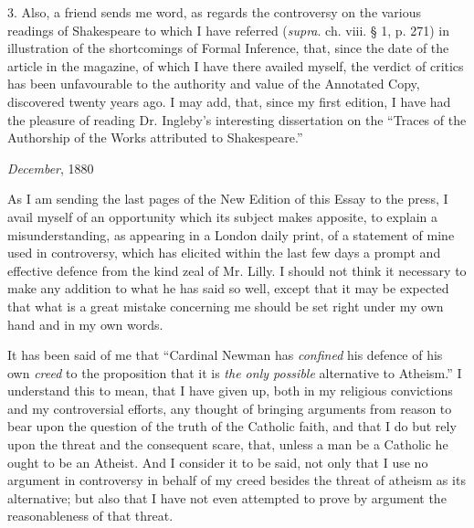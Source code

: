3. Also, a friend sends me word, as regards the controversy on the
various readings of Shakespeare to which I have referred (\emph{supra}.
ch. viii. § 1, p. 271) in illustration of the shortcomings of Formal
Inference, that, since the date of the article in the magazine, of
which I have there availed myself, the verdict of critics has been
unfavourable to the authority and value of the Annotated Copy,
discovered twenty years ago. I may add, that, since my first edition,
I have had the pleasure of reading Dr. Ingleby's interesting
dissertation on the ``Traces of the Authorship of the Works
attributed to Shakespeare.''








\emph{December}, 1880

As I am sending the last pages of the New Edition of this Essay to
the press, I avail myself of an opportunity which its subject makes
apposite, to explain a misunderstanding, as appearing in a London
daily print, of a statement of mine used in controversy, which has
elicited within the last few days a prompt and effective defence from
the kind zeal of Mr. Lilly. I should not think it necessary to make
any addition to what he has said so well, except that it may be
expected that what is a great mistake concerning me should be set
right under my own hand and in my own words.


It has been said of me that ``Cardinal Newman has \emph{confined}
his defence of his own \emph{creed} to the proposition that it is \emph{the
only possible} alternative to Atheism.'' I understand this to
mean, that I have given up, both in my religious convictions and my
controversial efforts, any thought of bringing arguments from reason
to bear upon the question of the truth of the Catholic faith, and that
I do but rely upon the threat and the consequent scare, that, unless a
man be a Catholic he ought to be an Atheist. And I consider it to be
said, not only that I use no argument in controversy in behalf of my
creed besides the threat of atheism as its alternative; but also that
I have not even attempted to prove by argument the reasonableness of
that threat.


